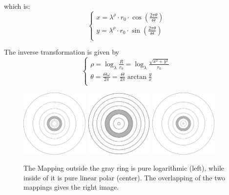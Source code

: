 \documentclass{article}
\begin{document}
which is:
\begin{equation}
	\begin{cases}
	x=\lambda^{\rho} \cdot r_{0} \cdot \cos (\frac{2\pi\theta }{\Theta})\\
	y=\lambda^{\rho} \cdot r_{0} \cdot \sin (\frac{2\pi\theta }{\Theta})\\
	\end{cases}
\end{equation}

The inverse transformation is given by
\begin{equation}
	\begin{cases}
	\rho=\log_{\lambda}\frac{R}{r_{0}}= \log_{\lambda}\frac{\sqrt{x^2+y^2}}{r_{0}}\\
	\theta=\frac{\Theta\omega}{2\pi}=\frac{\Theta}{2\pi}\arctan\frac{y}{x}\\
	\end{cases}
\end{equation}

\begin{figure}[htb]
	\includegraphics[width=0.30\textwidth]{PureLog.eps}
	\includegraphics[width=0.30\textwidth]{LinPolar.eps}
	\includegraphics[width=0.30\textwidth]{LogPolarAndFovea.eps}
	\caption{The Mapping outside the gray ring is pure logarithmic (left), while inside of it is pure linear polar (center). The overlapping of the two mappings gives the right image.}
	\label{fig:LinandLogPolar}
\end{figure}
\end{document}
